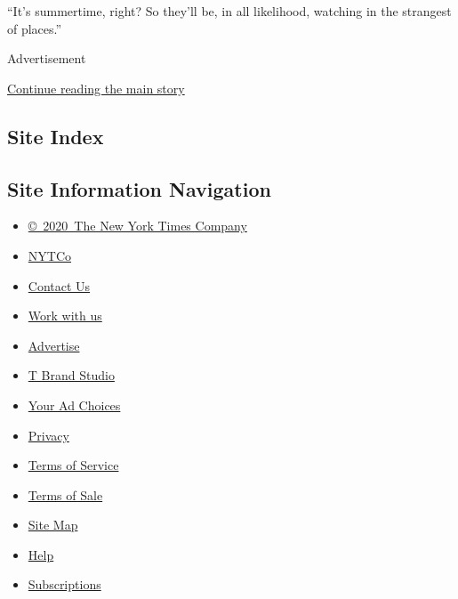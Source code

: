 ``It's summertime, right? So they'll be, in all likelihood, watching in
the strangest of places.''

Advertisement

\protect\hyperlink{after-bottom}{Continue reading the main story}

\hypertarget{site-index}{%
\subsection{Site Index}\label{site-index}}

\hypertarget{site-information-navigation}{%
\subsection{Site Information
Navigation}\label{site-information-navigation}}

\begin{itemize}
\tightlist
\item
  \href{https://help.nytimes.com/hc/en-us/articles/115014792127-Copyright-notice}{©~2020~The
  New York Times Company}
\end{itemize}

\begin{itemize}
\tightlist
\item
  \href{https://www.nytco.com/}{NYTCo}
\item
  \href{https://help.nytimes.com/hc/en-us/articles/115015385887-Contact-Us}{Contact
  Us}
\item
  \href{https://www.nytco.com/careers/}{Work with us}
\item
  \href{https://nytmediakit.com/}{Advertise}
\item
  \href{http://www.tbrandstudio.com/}{T Brand Studio}
\item
  \href{https://www.nytimes.com/privacy/cookie-policy\#how-do-i-manage-trackers}{Your
  Ad Choices}
\item
  \href{https://www.nytimes.com/privacy}{Privacy}
\item
  \href{https://help.nytimes.com/hc/en-us/articles/115014893428-Terms-of-service}{Terms
  of Service}
\item
  \href{https://help.nytimes.com/hc/en-us/articles/115014893968-Terms-of-sale}{Terms
  of Sale}
\item
  \href{https://spiderbites.nytimes.com}{Site Map}
\item
  \href{https://help.nytimes.com/hc/en-us}{Help}
\item
  \href{https://www.nytimes.com/subscription?campaignId=37WXW}{Subscriptions}
\end{itemize}
